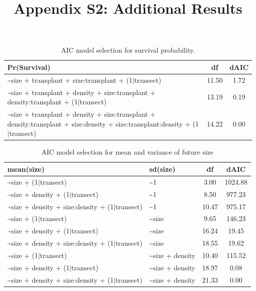 \documentclass[11pt]{article}\usepackage[]{graphicx}\usepackage[usenames,dvipsnames]{xcolor}
\title{Appendix S2: Additional Results}
\author{ }
\date{\vspace{-5ex}}
\begin{document}
\maketitle
\renewcommand{\thefigure}{S\arabic{figure}}\setcounter{figure}{0}
\renewcommand{\thetable}{S\arabic{table}}\setcounter{table}{0}
\renewcommand{\theequation}{S\arabic{equation}}\setcounter{equation}{0}

\begin{table}[ht]
\centering
\begin{tabular}{|p{12cm}|c|c|}
  \hline
Pr(Survival) & df & dAIC \\ 
  \hline
\~{}size + transplant + size:transplant + (1$|$transect) & 11.50 & 1.72 \\ 
  \~{}size + transplant + density + size:transplant + density:transplant + (1$|$transect) & 13.19 & 0.19 \\ 
  \~{}size + transplant + density + size:transplant + density:transplant + size:density + size:transplant:density + (1$|$transect) & 14.22 & 0.00 \\ 
   \hline
\end{tabular}
\caption{AIC model selection for survival probability.} 
\label{tab:surv_aic}
\end{table}


\begin{table}[ht]
\centering
\begin{tabular}{|p{8cm}|p{4cm}|c|c|}
  \hline
mean(size) & sd(size) & df & dAIC \\ 
  \hline
\~{}size + (1$|$transect) & \~{}1 & 3.00 & 1024.88 \\ 
  \~{}size + density + (1$|$transect) & \~{}1 & 8.50 & 977.23 \\ 
  \~{}size + density + size:density + (1$|$transect) & \~{}1 & 10.47 & 975.17 \\ 
  \~{}size + (1$|$transect) & \~{}size & 9.65 & 146.23 \\ 
  \~{}size + density + (1$|$transect) & \~{}size & 16.24 & 19.45 \\ 
  \~{}size + density + size:density + (1$|$transect) & \~{}size & 18.55 & 19.62 \\ 
  \~{}size + (1$|$transect) & \~{}size + density & 10.40 & 115.52 \\ 
  \~{}size + density + (1$|$transect) & \~{}size + density & 18.97 & 0.08 \\ 
  \~{}size + density + size:density + (1$|$transect) & \~{}size + density & 21.33 & 0.00 \\ 
   \hline
\end{tabular}
\caption{AIC model selection for mean and variance of future size} 
\label{tab:grow_aic}
\end{table}
\end{document}
